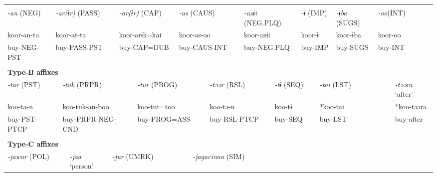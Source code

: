 \tabletail{}
\tablelasttail{}
\begin{tabularx}{\textwidth}{XXXXXXXXXXXXXXXXXXXXXXX}
\lsptoprule
\multicolumn{23}{X}{{\bfseries Type-A affixes}}\\
{ \textit{{}-an} (NEG)} & \multicolumn{5}{X}{{ \textit{{}-ar(ɨr)} (PASS)}} & \multicolumn{3}{X}{{ \textit{{}-ar(ɨr)} (CAP)}} & \multicolumn{4}{X}{{ \textit{{}-as} (CAUS)}} & \multicolumn{4}{X}{{ \textit{{}-azɨi} (NEG.PLQ)}} & \multicolumn{2}{X}{{ \textit{{}-ɨ} (IMP)}} & { \textit{{}-ɨba} (SUGS)} & \multicolumn{2}{X}{{ \textit{{}-oo}(INT)}} & \\
{ koor-an-ta} & \multicolumn{5}{X}{{ koor-at-ta}} & \multicolumn{3}{X}{{ koor-arɨk=kai}} & \multicolumn{4}{X}{{ koor-as-oo}} & \multicolumn{4}{X}{{ koor-azɨi}} & \multicolumn{2}{X}{{ koor-ɨ}} & { koor-ɨba} & \multicolumn{2}{X}{{ koor-oo}} & \\
buy-NEG-PST & \multicolumn{5}{X}{buy-PASS-PST} & \multicolumn{3}{X}{buy-CAP=DUB} & \multicolumn{4}{X}{buy-CAUS-INT} & \multicolumn{4}{X}{buy-NEG.PLQ} & \multicolumn{2}{X}{buy-IMP} & buy-SUGS & \multicolumn{2}{X}{buy-INT} & \\
\multicolumn{23}{X}{}\\
\multicolumn{23}{X}{{\bfseries Type-B affixes}}\\
\multicolumn{2}{X}{{ \textit{{}-tar} (PST)}} & \multicolumn{5}{X}{{ \textit{{}-tuk} (PRPR)}} & \multicolumn{4}{X}{{ \textit{{}-tur} (PROG)}} & \multicolumn{4}{X}{{ \textit{{}-təər} (RSL)}} & \multicolumn{3}{X}{{ \textit{{}-tɨ} (SEQ)}} & \multicolumn{3}{X}{{ \textit{{}-tai} (LST)}} & \multicolumn{2}{X}{{ \textit{{}-təəra} ‘after’}}\\
\multicolumn{2}{X}{{ koo-ta-n}} & \multicolumn{5}{X}{{ koo-tuk-an-boo}} & \multicolumn{4}{X}{{ koo-tut=too}} & \multicolumn{4}{X}{{ koo-tə-n}} & \multicolumn{3}{X}{{ koo-tɨ}} & \multicolumn{3}{X}{{ *koo-tai}} & \multicolumn{2}{X}{{ *koo-təəra}}\\
\multicolumn{2}{X}{buy-PST-PTCP} & \multicolumn{5}{X}{buy-PRPR-NEG-CND} & \multicolumn{4}{X}{buy-PROG=ASS} & \multicolumn{4}{X}{buy-RSL-PTCP} & \multicolumn{3}{X}{buy-SEQ} & \multicolumn{3}{X}{buy-LST} & \multicolumn{2}{X}{{ buy-after}}\\
\multicolumn{2}{X}{} & \multicolumn{5}{X}{} & \multicolumn{4}{X}{} & \multicolumn{4}{X}{} & \multicolumn{3}{X}{} & \multicolumn{3}{X}{} & \multicolumn{2}{X}{}\\
\multicolumn{23}{X}{{\bfseries Type-C affixes}}\\
\multicolumn{3}{X}{{ \textit{{}-jawur} (POL)}} & \multicolumn{2}{X}{{ \textit{{}-jaa} ‘person’}} & \multicolumn{5}{X}{{ \textit{{}-jur} (UMRK)}} & \multicolumn{4}{X}{{ \textit{{}-jagacinaa} (SIM)}} & \multicolumn{9}{X}{}\\

\end{tabularx}
